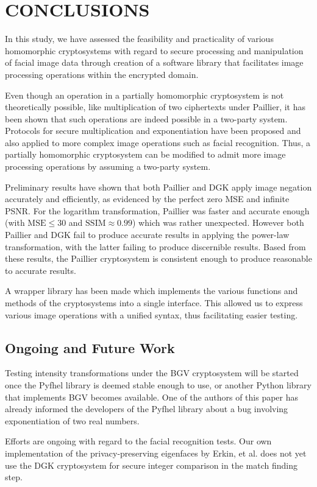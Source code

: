 \chapter{CONCLUSIONS}
In this study, we have assessed the feasibility and practicality of various homomorphic cryptosystems with regard to secure processing and manipulation of facial image data through creation of a software library that facilitates image processing operations within the encrypted domain.

Even though an operation in a partially homomorphic cryptosystem is not theoretically possible, like multiplication of two ciphertexts under Paillier, it has been shown that such operations are indeed possible in a two-party system. Protocols for secure multiplication and exponentiation have been proposed and also applied to more complex image operations such as facial recognition. Thus, a partially homomorphic cryptosystem can be modified to admit more image processing operations by assuming a two-party system.

Preliminary results have shown that both Paillier and DGK apply image negation accurately and efficiently, as evidenced by the perfect zero MSE and infinite PSNR. For the logarithm transformation, Paillier was faster and accurate enough (with $\text{MSE} \le 30$ and $\text{SSIM} \approx 0.99$) which was rather unexpected. However both Paillier and DGK fail to produce accurate results in applying the power-law transformation, with the latter failing to produce discernible results. Based from these results, the Paillier cryptosystem is consistent enough to produce reasonable to accurate results.

A wrapper library has been made which implements the various functions and methods of the cryptosystems into a single interface. This allowed us to express various image operations with a unified syntax, thus facilitating easier testing.

\section{Ongoing and Future Work}
Testing intensity transformations under the BGV cryptosystem will be started once the Pyfhel library is deemed stable enough to use, or another Python library that implements BGV becomes available.
One of the authors of this paper has already informed the developers of the Pyfhel library about a bug involving exponentiation of two real numbers.

Efforts are ongoing with regard to the facial recognition tests. Our own implementation of the privacy-preserving eigenfaces by Erkin, et al. does not yet use the DGK cryptosystem for secure integer comparison in the match finding step.

